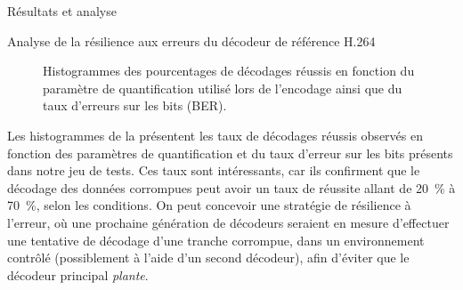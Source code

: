\begin{chapter}{Résultats et analyse}
\begin{section}{Analyse de la résilience aux erreurs du décodeur de référence H.264}
\begin{figure}
\caption[Histogrammes des pourcentages de décodages réussis]{Histogrammes des
pourcentages de décodages réussis en fonction du paramètre de quantification
utilisé lors de l'encodage ainsi que du taux d'erreurs sur les bits (BER).}
\label{fig-Decodings}
\vspace{2em}
\end{figure}

Les histogrammes de la  présentent les taux de décodages
réussis observés en fonction des paramètres de quantification et du taux
d'erreur sur les bits présents dans notre jeu de tests. Ces taux sont
intéressants, car ils confirment que le décodage des données corrompues peut
avoir un taux de réussite allant de 20~\% à 70~\%, selon les conditions. On peut
concevoir une stratégie de résilience à l'erreur, où une prochaine génération de
décodeurs seraient en mesure d'effectuer une tentative de décodage d'une tranche
corrompue, dans un environnement contrôlé (possiblement à l'aide d'un second
décodeur), afin d'éviter que le décodeur principal \textit{plante}.


\end{section}
\end{chapter}
